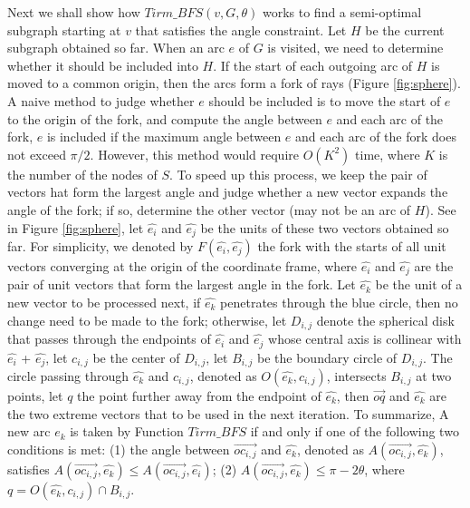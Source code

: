 Next we shall show how $Tirm\_BFS(v, G, \theta)$ works to find a semi-optimal subgraph starting at $v$ that satisfies the angle constraint. Let $H$ be the current subgraph obtained so far. When an arc $e$ of $G$ is visited, we need to determine whether it should be included into $H$. If the start of each outgoing arc of $H$ is moved to a common origin, then the arcs form a fork of rays (Figure \ref{fig:sphere}). A naive method to judge whether $e$ should be included is to move the start of $e$ to the origin of the fork, and compute the angle between $e$ and each arc of the fork, $e$ is included if the maximum angle between $e$ and each arc of the fork does not exceed $\pi/2$. However, this method would require $O(K^{2})$ time, where $K$ is the number of the nodes of $S$. To speed up this process, we keep the pair of vectors hat form the largest angle and judge whether a new vector expands the angle of the fork; if so, determine the other vector (may not be an arc of $H$). See in Figure \ref{fig:sphere}, let $\hat{e_i}$  and $\hat{e_j}$ be the units of these two vectors obtained so far. For simplicity, we denoted by $F( \hat{e_i}, \hat{e_j} )$ the fork with the starts of all unit vectors converging at the origin of the coordinate frame, where $\hat{e_i}$  and  $\hat{e_j}$  are the pair of unit vectors that form the largest angle in the fork. Let $\hat{e_k}$  be the unit of a new vector to be processed next, if $\hat{e_k}$ penetrates through the blue circle, then no change need to be made to the fork; otherwise, let $D_{i,j}$ denote the spherical disk that passes through the endpoints of $\hat{e_i}$  and $\hat{e_j}$ whose central axis is collinear with $\hat{e_i}$  + $\hat{e_j}$, let $c_{i,j}$ be the center of $D_{i,j}$, let $B_{i,j}$ be the boundary circle of $D_{i,j}$. The circle passing through $\hat{e_k}$  and $c_{i,j}$, denoted as $O( \hat{e_k}, c_{i,j})$, intersects  $B_{i,j}$ at two points, let $q$ the point further away from the endpoint of $\hat{e_k}$, then $\overrightarrow{oq}$ and $\hat{e_k}$ are the two extreme vectors that to be used in the next iteration. To summarize,
A new arc $e_k$ is taken by Function $Tirm\_BFS$ if and only if one of the following two conditions is met:
(1) the angle between $\overrightarrow{oc_{i,j}}$ and $\hat{e_k}$, denoted as $A(\overrightarrow{oc_{i,j}}, \hat{e_k})$, satisfies  $A(\overrightarrow{oc_{i,j}}, \hat{e_k}) \leq A(\overrightarrow{oc_{i,j}}, \hat{e_i})$;
(2) $A(\overrightarrow{oc_{i,j}}, \hat{e_k})  \leq \pi - 2\theta$, where $q = O( \hat{e_k}, c_{i,j}) \cap B_{i,j}$.



